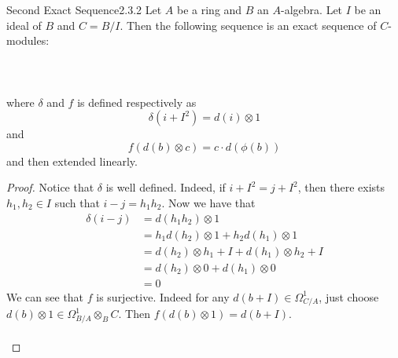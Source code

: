 \documentclass[a4paper]{article}
\begin{document}
\begin{thm}{Second Exact Sequence}{2.3.2} Let $A$ be a ring and $B$ an $A$-algebra. Let $I$ be an ideal of $B$ and $C=B/I$. Then the following sequence is an exact sequence of $C$-modules: \\~\\
\\~\\
where $\delta$ and $f$ is defined respectively as $$\delta(i+I^2)=d(i)\otimes 1$$ and $$f(d(b)\otimes c)=c\cdot d(\phi(b))$$ and then extended linearly. 
\begin{proof}
Notice that $\delta$ is well defined. Indeed, if $i+I^2=j+I^2$, then there exists $h_1,h_2\in I$ such that $i-j=h_1h_2$. Now we have that 
\begin{align*}
\delta(i-j)&=d(h_1h_2)\otimes 1\\
&=h_1d(h_2)\otimes 1+h_2d(h_1)\otimes 1\\
&=d(h_2)\otimes h_1+I+d(h_1)\otimes h_2+I\\
&=d(h_2)\otimes 0+d(h_1)\otimes 0\\
&=0
\end{align*}
We can see that $f$ is surjective. Indeed for any $d(b+I)\in\Omega_{C/A}^1$, just choose $d(b)\otimes 1\in\Omega_{B/A}^1\otimes_BC$. Then $f(d(b)\otimes 1)=d(b+I)$. \\~\\


\end{proof}
\end{thm}
\end{document}
